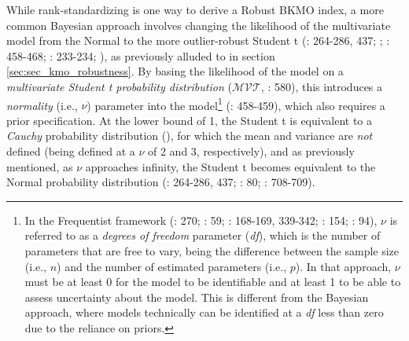 \documentclass[
  10pt,
  a4paper,
  twoside]{article}
\begin{document}
While rank-standardizing is one way to derive a Robust BKMO index, a more common Bayesian approach involves changing the likelihood of the multivariate model from the Normal to the more outlier-robust Student t (: 264-286, 437; ; : 458-468; : 233-234; ), as previously alluded to in section \ref{sec:sec_kmo_robustness}. By basing the likelihood of the model on a \emph{multivariate Student t probability distribution} (\(\mathcal{MVT}\), : 580), this introduces a \emph{normality} (i.e., \(\nu\)) parameter into the model\footnote{In the Frequentist framework (: 270; : 59; : 168-169, 339-342; : 154; : 94), \(\nu\) is referred to as a \emph{degrees of freedom} parameter (\emph{df}), which is the number of parameters that are free to vary, being the difference between the sample size (i.e., \(n\)) and the number of estimated parameters (i.e., \(p\)). In that approach, \(\nu\) must be at least 0 for the model to be identifiable and at least 1 to be able to assess uncertainty about the model. This is different from the Bayesian approach, where models technically can be identified at a \emph{df} less than zero due to the reliance on priors.} (: 458-459), which also requires a prior specification. At the lower bound of 1, the Student t is equivalent to a \emph{Cauchy} probability distribution (), for which the mean and variance are \emph{not} defined (being defined at a \(\nu\) of 2 and 3, respectively), and as previously mentioned, as \(\nu\) approaches infinity, the Student t becomes equivalent to the Normal probability distribution (: 264-286, 437; : 80; : 708-709).
\end{document}
